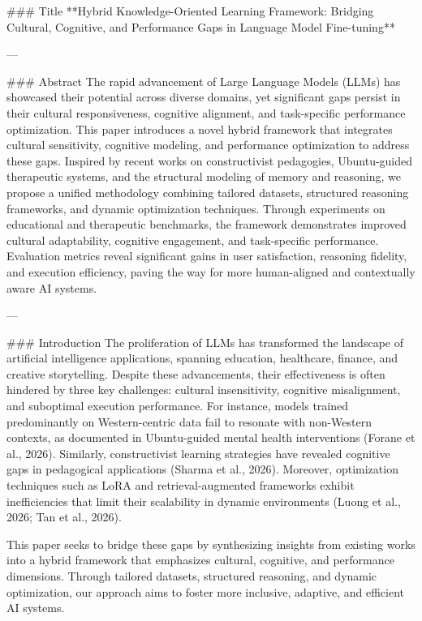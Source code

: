 ### Title
**Hybrid Knowledge-Oriented Learning Framework: Bridging Cultural, Cognitive, and Performance Gaps in Language Model Fine-tuning**

---

### Abstract
The rapid advancement of Large Language Models (LLMs) has showcased their potential across diverse domains, yet significant gaps persist in their cultural responsiveness, cognitive alignment, and task-specific performance optimization. This paper introduces a novel hybrid framework that integrates cultural sensitivity, cognitive modeling, and performance optimization to address these gaps. Inspired by recent works on constructivist pedagogies, Ubuntu-guided therapeutic systems, and the structural modeling of memory and reasoning, we propose a unified methodology combining tailored datasets, structured reasoning frameworks, and dynamic optimization techniques. Through experiments on educational and therapeutic benchmarks, the framework demonstrates improved cultural adaptability, cognitive engagement, and task-specific performance. Evaluation metrics reveal significant gains in user satisfaction, reasoning fidelity, and execution efficiency, paving the way for more human-aligned and contextually aware AI systems.

---

### Introduction
The proliferation of LLMs has transformed the landscape of artificial intelligence applications, spanning education, healthcare, finance, and creative storytelling. Despite these advancements, their effectiveness is often hindered by three key challenges: cultural insensitivity, cognitive misalignment, and suboptimal execution performance. For instance, models trained predominantly on Western-centric data fail to resonate with non-Western contexts, as documented in Ubuntu-guided mental health interventions (Forane et al., 2026). Similarly, constructivist learning strategies have revealed cognitive gaps in pedagogical applications (Sharma et al., 2026). Moreover, optimization techniques such as LoRA and retrieval-augmented frameworks exhibit inefficiencies that limit their scalability in dynamic environments (Luong et al., 2026; Tan et al., 2026).

This paper seeks to bridge these gaps by synthesizing insights from existing works into a hybrid framework that emphasizes cultural, cognitive, and performance dimensions. Through tailored datasets, structured reasoning, and dynamic optimization, our approach aims to foster more inclusive, adaptive, and efficient AI systems.

